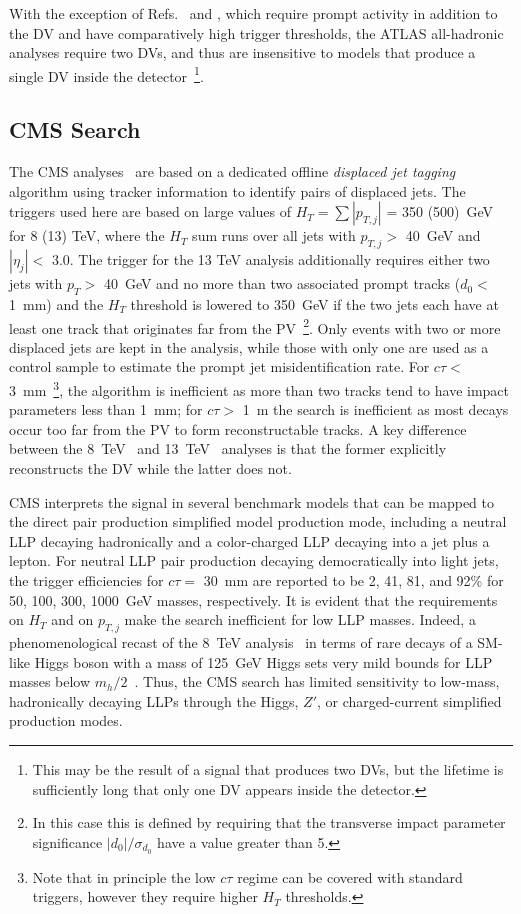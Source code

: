 With the exception of Refs.~\cite{Aad:2015rba} and \cite{Aaboud:2017iio}, which require prompt activity in addition to the DV and have comparatively high trigger thresholds, the ATLAS all-hadronic analyses require two DVs, and thus are insensitive to models that produce a single DV inside the detector~\footnote{This may be the result of a signal that produces two DVs, but the lifetime is sufficiently long that only one DV appears inside the detector.}.

\subsection{CMS Search}

The CMS analyses~\cite{Aad:2015rba,Sirunyan:2017jdo} are based on a dedicated offline \emph{displaced jet tagging} algorithm using tracker information to identify pairs of displaced jets. The triggers used here are based on large values of $H_T = \sum |p_{T,j}|$ = 350 (500)~GeV for 8 (13) TeV, where the $H_T$ sum runs over all jets with $p_{T,j} >$ 40~GeV and $|\eta_j| <$ 3.0. The trigger for the 13 TeV analysis additionally requires either two jets with $p_T >$ 40~GeV and no more than two associated prompt tracks ($d_0 <$ 1~mm) and the $H_T$ threshold is lowered to 350~GeV if the two jets each have at least one track that originates far from the PV~\footnote{In this case this is defined by requiring that the transverse impact parameter significance $|d_0|/\sigma_{d_0}$ have a value greater than 5.}. Only events with two or more displaced jets are kept in the analysis, while those with only one are used as a control sample to estimate the prompt jet misidentification rate. For $c \tau <$ 3~mm~\footnote{Note that in principle the low $c \tau$ regime can be covered with standard triggers, however they require higher $H_T$ thresholds.}, the algorithm is inefficient as more than two tracks tend to have impact parameters less than 1~mm; for $c \tau >$ 1~m the search is inefficient as most decays occur too far from the PV to form reconstructable tracks. A key difference between the 8~TeV~\cite{Khachatryan:2015wka} and 13~TeV~\cite{Sirunyan:2017jdo} analyses is that the former explicitly reconstructs the DV while the latter does not.

CMS interprets the signal in several benchmark models that can be mapped to the direct pair production simplified model production mode, including a neutral LLP decaying hadronically and a color-charged LLP decaying into a jet plus a lepton. For neutral LLP pair production decaying democratically into light jets, the trigger efficiencies for $c \tau =$ 30~mm are reported to be 2, 41, 81, and 92\% for 50, 100, 300, 1000~GeV masses, respectively. It is evident that the requirements on $H_T$ and on $p_{T,j}$ make the search inefficient for low LLP masses. Indeed, a phenomenological recast of the 8~TeV analysis~\cite{CMS:2014wda} in terms of rare decays of a SM-like Higgs boson with a mass of 125~GeV Higgs sets very mild bounds for LLP masses below $m_h / 2$~\cite{Csaki:2015fba}. Thus, the CMS search has limited sensitivity to low-mass, hadronically decaying LLPs through the Higgs, $Z'$, or charged-current simplified production modes.

